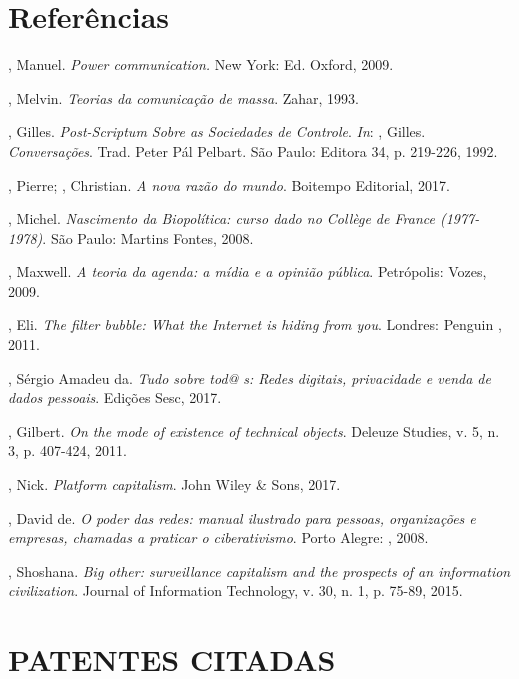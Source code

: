 \section{Referências}

\begin{Parskip}
, Manuel. \emph{Power communication.} New York: Ed. Oxford,
2009.

, Melvin. \emph{Teorias da comunicação de massa}. Zahar, 1993.

, Gilles. \emph{Post-Scriptum Sobre as Sociedades de Controle}. \emph{In}:
, Gilles. \emph{Conversações}. Trad. Peter Pál Pelbart. São Paulo:
Editora 34, p. 219-226, 1992.

, Pierre; , Christian. \emph{A nova razão do mundo}.
Boitempo Editorial, 2017.

, Michel. \emph{Nascimento da Biopolítica: curso dado no
Collège de France (1977-1978)}. São Paulo: Martins Fontes, 2008.

, Maxwell. \emph{A teoria da agenda: a mídia e a opinião
pública}. Petrópolis: Vozes, 2009.

, Eli. \emph{The filter bubble: What the Internet is hiding
from you}. Londres: Penguin , 2011.

, Sérgio Amadeu da. \emph{Tudo sobre tod@ s: Redes digitais,
privacidade e venda de dados pessoais}. Edições Sesc, 2017.

, Gilbert. \emph{On the mode of existence of technical
objects}. Deleuze Studies, v. 5, n. 3, p. 407-424, 2011.

, Nick. \emph{Platform capitalism}. John Wiley \& Sons, 2017.

, David de. \emph{O poder das redes: manual ilustrado para
pessoas, organizações e empresas, chamadas a praticar o ciberativismo}.
Porto Alegre: , 2008.

, Shoshana. \emph{Big other: surveillance capitalism and the
prospects of an information civilization}. Journal of Information
Technology, v. 30, n. 1, p. 75-89, 2015.\\
\end{Parskip}

\section{PATENTES CITADAS}

